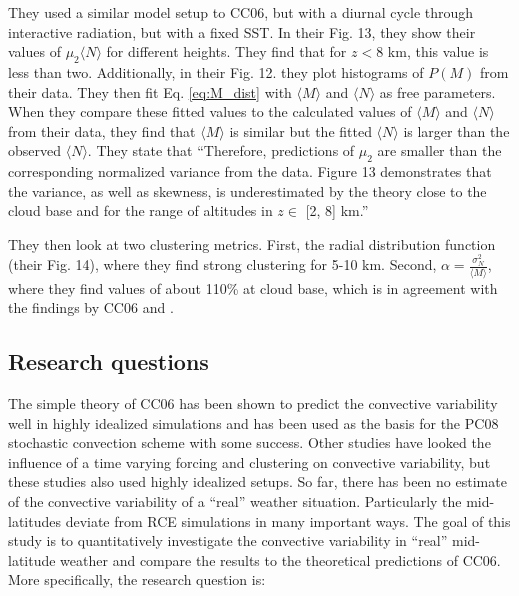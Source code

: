 \documentclass[a4paper, 12pt]{article}
\begin{document}
\subsubsection{\cite{Davoudi2010}}
They used a similar model setup to CC06, but with a diurnal cycle through interactive radiation, but with a fixed SST. In their Fig. 13, they show their values of $\mu_2 \langle N \rangle$ for different heights. They find that for $z <$8 km, this value is less than two. Additionally, in their Fig. 12. they plot histograms of $P(M)$ from their data. They then fit Eq. \ref{eq:M_dist} with $\langle M \rangle$ and $\langle N \rangle$ as free parameters. When they compare these fitted values to the calculated values of $\langle M \rangle$ and $\langle N \rangle$ from their data, they find that $\langle M \rangle$  is similar but the fitted $\langle N \rangle$ is larger than the observed $\langle N \rangle$. They state that ``Therefore, predictions of $\mu_2$ are smaller than the corresponding normalized variance from the data. Figure 13 demonstrates that the variance, as well as skewness, is underestimated by the theory close to the cloud base and for the range of altitudes in $z \in$  [2, 8] km.''

They then look at two clustering metrics. First, the radial distribution function (their Fig. 14), where they find strong clustering for 5-10 km. Second, $\alpha = \frac{\sigma_N^2}{\langle M \rangle}$, where they find values of about 110\% at cloud base, which is in agreement with the findings by CC06 and \cite{Davies2008}. 

\subsection{Research questions}
The simple theory of CC06 has been shown to predict the convective variability well in highly idealized simulations and has been used as the basis for the PC08 stochastic convection scheme with some success. Other studies have looked the influence of a time varying forcing and clustering on convective variability, but these studies also used highly idealized setups. So far, there has been no estimate of the convective variability of a ``real'' weather situation. Particularly the mid-latitudes deviate from RCE simulations in many important ways. The goal of this study is to quantitatively investigate the convective variability in ``real'' mid-latitude weather and compare the results to the theoretical predictions of CC06. More specifically, the research question is:
\end{document}
